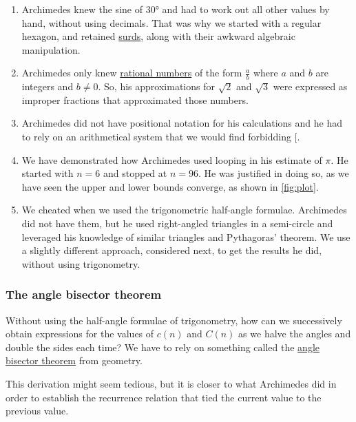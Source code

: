\documentclass[
  a4paper,
]{article}
\begin{document}
\begin{enumerate}
\def\labelenumi{(\alph{enumi})}
\item
  Archimedes knew the sine of 30° and had to work out all other values
  by hand, without using decimals. That was why we started with a
  regular hexagon, and retained
  \href{https://www.thefreedictionary.com/surds}{surds}, along with
  their awkward algebraic manipulation.
\item
  Archimedes only knew
  \href{https://www.britannica.com/science/rational-number}{rational
  numbers} of the form \(\frac{a}{b}\) where \(a\) and \(b\) are
  integers and \(b \neq 0\). So, his approximations for \(\sqrt{2}\) and
  \(\sqrt{3}\) were expressed as improper fractions that approximated
  those numbers.
\item
  Archimedes did not have positional notation for his calculations and
  he had to rely on an arithmetical system that we would find forbidding
  {[}\citeproc{ref-heath2002}{3}{]}.
\item
  We have demonstrated how Archimedes used looping in his estimate of
  \(\pi\). He started with \(n = 6\) and stopped at \(n=96\). He was
  justified in doing so, as we have seen the upper and lower bounds
  converge, as shown in \cref{fig:plot}.
\item
  We cheated when we used the trigonometric half-angle formulae.
  Archimedes did not have them, but he used right-angled triangles in a
  semi-circle and leveraged his knowledge of similar triangles and
  Pythagoras' theorem. We use a slightly different approach, considered
  next, to get the results he did, without using trigonometry.
\end{enumerate}

\subsubsection{The angle bisector
theorem}\label{the-angle-bisector-theorem}

Without using the half-angle formulae of trigonometry, how can we
successively obtain expressions for the values of \(c(n)\) and \(C(n)\)
as we halve the angles and double the sides each time? We have to rely
on something called the
\href{https://en.wikipedia.org/wiki/Angle_bisector_theorem}{angle
bisector theorem} from geometry.

This derivation might seem tedious, but it is closer to what Archimedes
did in order to establish the recurrence relation that tied the current
value to the previous value.
\end{document}
